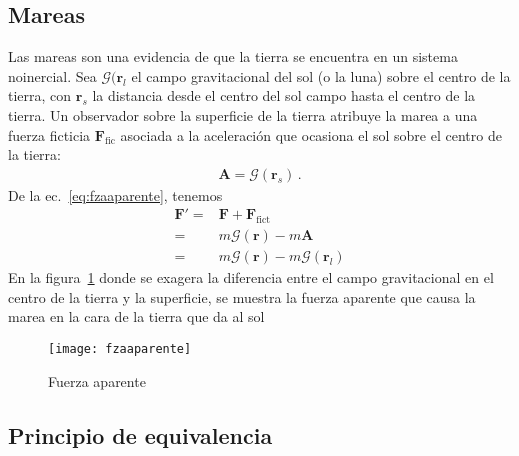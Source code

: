 \subsection{Mareas}
Las mareas son una evidencia de que la tierra se encuentra en un sistema noinercial. Sea $\boldsymbol{\mathcal{G}}(\mathbf{r}_{l}$ el campo gravitacional del sol (o la luna) sobre el centro  de la tierra, con $\mathbf{r}_{s}$ la distancia desde el centro del sol campo hasta el centro de la tierra. Un observador sobre la superficie de la tierra atribuye la marea a una fuerza ficticia $\mathbf{F}_{\text{fic}}$ asociada a la aceleración que ocasiona el sol sobre el centro de la tierra:
\begin{align}
  \mathbf{A}=\mathcal{G}(\mathbf{r}_s)\,.
\end{align}
De la ec.~\eqref{eq:fzaaparente}, tenemos
\begin{align}
  \mathbf{F}'=&\mathbf{F}+\mathbf{F}_{\text{fict}}\nonumber\\
  =&m \boldsymbol{\mathcal{G}}(\mathbf{r})-m\mathbf{A}\nonumber\\
  =&m \boldsymbol{\mathcal{G}}(\mathbf{r})-m \boldsymbol{\mathcal{G}}(\mathbf{r}_l)
\end{align}
En la figura~\ref{fig:fzaaparente} donde se exagera la diferencia entre el campo gravitacional en el centro de la tierra y la superficie, se muestra la fuerza aparente que causa la marea en la cara de la tierra que da al sol
\begin{frame}
\begin{figure}
  \centering
  \texttt{[image: fzaaparente]}
  \caption{Fuerza aparente}
  \label{fig:fzaaparente}
\end{figure}
\end{frame}

\subsection{Principio de equivalencia}



